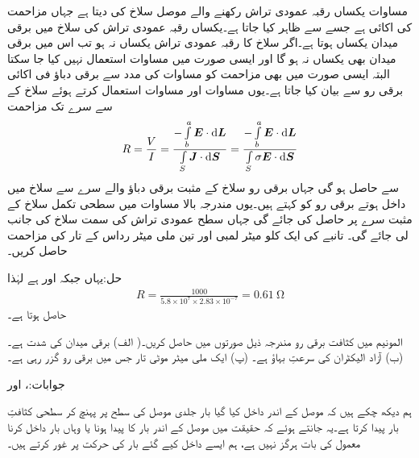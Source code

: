 مساوات  یکساں رقبہ عمودی تراش رکھنے والے موصل سلاخ کی  دیتا ہے جہاں مزاحمت کی اکائی  ہے جسے  سے ظاہر کیا جاتا ہے۔یکساں رقبہ عمودی تراش کی سلاخ میں برقی میدان یکساں ہوتا ہے۔اگر سلاخ کا رقبہ عمودی تراش یکساں نہ ہو تب اس میں برقی میدان بھی یکساں نہ ہو گا اور ایسی صورت میں مساوات  استعمال نہیں کیا جا سکتا البتہ ایسی صورت میں بھی مزاحمت کو مساوات  کی مدد سے برقی دباؤ فی اکائی برقی رو سے بیان کیا جاتا ہے۔یوں مساوات  اور مساوات  استعمال کرتے ہوئے سلاخ کے   سے  سرے تک مزاحمت
\begin{align}\label{مساوات_کپیسٹر_مزاحمت_کی_عمومی_مساوات}
R=\frac{V}{I}=\frac{-\int \limits_b^a \kvec{E} \cdot \dif \kvec{L}}{\int \limits_S \kvec{J} \cdot \dif \kvec{S}}=\frac{-\int \limits_b^a \kvec{E} \cdot \dif \kvec{L}}{\int \limits_S \sigma \kvec{E} \cdot \dif \kvec{S}}
\end{align} 
سے حاصل ہو گی جہاں برقی رو سلاخ کے مثبت برقی دباؤ والے سرے سے سلاخ میں داخل ہوتے برقی رو کو کہتے ہیں۔یوں مندرجہ بالا مساوات میں سطحی تکمل سلاخ کے مثبت سرے پر حاصل کی جائے گی جہاں سطح عمودی تراش کی سمت سلاخ کی جانب لی جائے گی۔
تانبے کی ایک کلو میٹر لمبی اور تین ملی میٹر رداس کے تار کی مزاحمت حاصل کریں۔

حل:یہاں  جبکہ  اور  ہے لہٰذا
\begin{align*}
R=\frac{1000}{5.8\times 10^7 \times 2.83 \times 10^{-7}}=\SI{0.61}{\ohm}
\end{align*}
حاصل ہوتا ہے۔

المونیم میں کثافت برقی رو مندرجہ ذیل صورتوں میں حاصل کریں۔( الف) برقی میدان کی شدت  ہے۔ (ب) آزاد الیکٹران کی سرعتِ بہاؤ  ہے۔ (پ) ایک ملی میٹر موٹی تار جس میں  برقی رو گزر رہی ہے۔

جوابات:،   اور 

ہم دیکھ چکے ہیں کہ موصل کے اندر داخل کیا گیا بار  جلدی موصل کی سطح پر پہنچ کر سطحی کثافتِ بار پیدا کرتا ہے۔یہ جانتے ہوئے کہ حقیقت میں موصل کے اندر بار کا پیدا ہونا یا وہاں بار داخل کرنا معمول کی بات ہرگز نہیں ہے، ہم ایسے داخل کیے گئے بار کی حرکت پر غور کرتے ہیں۔

